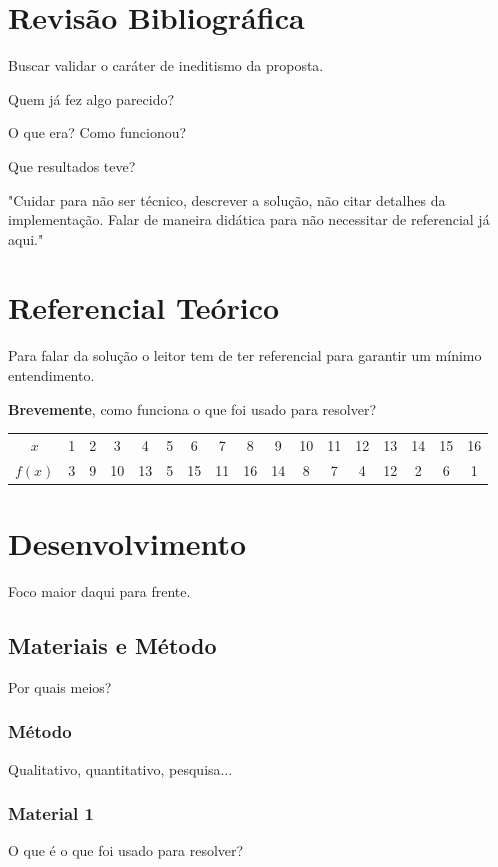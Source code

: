 \documentclass[
	article,			%
	11pt,				%
	oneside,			%
	a4paper,			%
	chapter=TITLE,		%
	section=TITLE,		%
	subsection=TITLE,	%
	subsubsection=TITLE, %
	english,			%
	brazil,				%
	sumario=tradicional
	]{ifrs-farr-artigo-abntex2}
\begin{document}
\section{Revisão Bibliográfica}
Buscar validar o caráter de ineditismo da proposta.

Quem já fez algo parecido?

O que era? Como funcionou?

Que resultados teve?
\begin{citacao}
"Cuidar para não ser técnico, descrever a solução, não citar detalhes da implementação. Falar de maneira didática para não necessitar de referencial já aqui."
\end{citacao}
\section{Referencial Teórico}

Para falar da solução o leitor tem de ter referencial para garantir um mínimo entendimento.

\textbf{Brevemente}, como funciona o que foi usado para resolver?
 
  
\begin{table}[htb]
  \begin{center}
    \label{tabela-oneway}
    \begin{tabular}{|c|c|c|c|c|c|c|c|c|c|c|c|c|c|c|c|c|}
      \hline
      $x$ & 1 & 2 & 3 & 4 & 5 & 6 & 7 & 8 & 9 & 10 & 11 & 12 & 13 & 14 & 15 & 16 \\
      $f(x)$ & 3 & 9 & 10 & 13 & 5 & 15 & 11 & 16 & 14 & 8 & 7 & 4 & 12 & 2 & 6 & 1 \\
      \hline
    \end{tabular}
  \end{center}
\end{table}

\section{Desenvolvimento}
Foco maior daqui para frente.
\subsection{Materiais e Método}
Por quais meios?

\subsubsection{Método}
Qualitativo, quantitativo, pesquisa...
\subsubsection{Material 1}
O que é o que foi usado para resolver?
\end{document}

